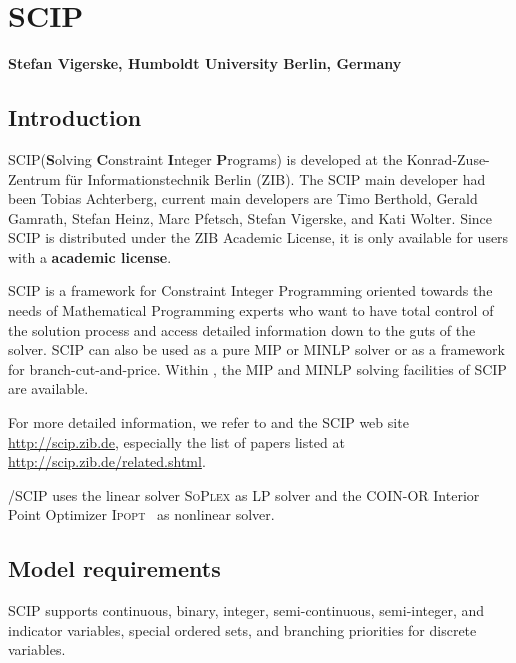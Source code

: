 
\newcommand{\SCIP}{\textsc{SCIP}\xspace}

\chapter{SCIP}
\textbf{Stefan Vigerske, Humboldt University Berlin, Germany}
\vspace{1cm}

\minitoc

\section{Introduction}

\SCIP (\textbf{S}olving \textbf{C}onstraint \textbf{I}nteger \textbf{P}rograms) is developed at the Konrad-Zuse-Zentrum f\"ur Informationstechnik Berlin (ZIB).
The \SCIP main developer had been Tobias Achterberg, current main developers are Timo Berthold, Gerald Gamrath, Stefan Heinz, Marc Pfetsch, Stefan Vigerske, and Kati Wolter.
Since \SCIP is distributed under the ZIB Academic License, it is only available for users with a \textbf{\GAMS academic license}.

\SCIP is a framework for Constraint Integer Programming oriented towards the needs of Mathematical Programming experts who want to have total control of the solution process and access detailed information down to the guts of the solver.
\SCIP can also be used as a pure MIP or MINLP solver or as a framework for branch-cut-and-price.
Within \GAMS, the MIP and MINLP solving facilities of \SCIP are available.

For more detailed information, we refer to \cite{Achterberg2007,Ach09,AchBeKoWo08,Berthold2006,BertholdHeinzVigerske2009,Vi12,Wolter2006} and the \SCIP web site \url{http://scip.zib.de}, especially the list of papers listed at \url{http://scip.zib.de/related.shtml}.

\GAMS/\SCIP uses the linear solver \textsc{SoPlex} \cite{Wunderling1996} as LP solver and the COIN-OR Interior Point Optimizer \textsc{Ipopt}~\cite{WaBi06} as nonlinear solver.

\section{Model requirements}

\SCIP supports continuous, binary, integer, semi-continuous, semi-integer, and indicator variables, special ordered sets, and branching priorities for discrete variables.

